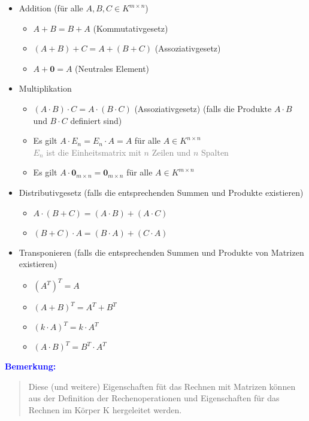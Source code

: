 \documentclass{article}
\newcommand{\gray}[1]{\textcolor{gray}{#1}}
\newcommand{\blue}[1]{\textcolor{blue}{#1}}
\newcommand{\an}[1]{\blue{\textbf{Bemerkung: }}\begin{quote}#1\end{quote}}
\begin{document}
\begin{itemize}
    \item Addition (für alle $A, B, C \in K^{m \times n}$)
    \begin{itemize}
        \item $A + B = B + A$ (Kommutativgesetz)
        \item $(A + B) + C = A + (B + C)$ (Assoziativgesetz)
        \item $A + \mathbf{0} = A$ (Neutrales Element)
    \end{itemize}
    \item Multiplikation
    \begin{itemize}
        \item $(A \cdot B) \cdot C = A \cdot (B \cdot C)$ (Assoziativgesetz) (falls die Produkte $A \cdot B$ und $B \cdot C$ definiert sind)
        \item Es gilt $A \cdot E_n = E_n \cdot A = A$ für alle $A \in K^{n \times n}$\\
        \gray{$E_n$ ist die Einheitsmatrix mit $n$ Zeilen und $n$ Spalten}
        \item Es gilt $A \cdot \mathbf{0}_{m \times n} = \mathbf{0}_{m \times n}$ für alle $A \in K^{m \times n}$
    \end{itemize}

    \newpage

    \item Distributivgesetz (falls die entsprechenden Summen und Produkte existieren)
    \begin{itemize}
        \item $A \cdot (B + C) = (A \cdot B) + (A \cdot C)$
        \item $(B + C) \cdot A = (B \cdot A) + (C \cdot A)$
    \end{itemize}
    \item Transponieren (falls die entsprechenden Summen und Produkte von Matrizen existieren)
    \begin{itemize}
        \item $(A^T)^T = A$
        \item $(A + B)^T = A^T + B^T$
        \item $(k \cdot A)^T = k \cdot A^T$
        \item $(A \cdot B)^T = B^T \cdot A^T$
    \end{itemize}
\end{itemize}

\an{Diese (und weitere) Eigenschaften füt das Rechnen mit Matrizen können aus der Definition der Rechenoperationen und Eigenschaften für das Rechnen im Körper K hergeleitet werden.}
\end{document}

